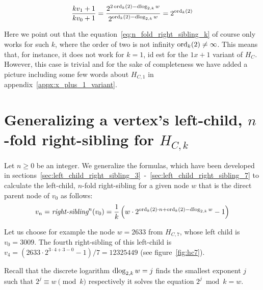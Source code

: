 \[
\frac{kv_1+1}{kv_0+1}=\frac{2^{2\operatorname{ord}_k(2)-\operatorname{dlog}_{2,k}w}}{2^{\operatorname{ord}_k(2)-\operatorname{dlog}_{2,k}w}}=2^{\operatorname{ord}_k(2)}
\]

Here we point out that the equation~\ref{eq:n_fold_right_sibling_k} of course only works for such $k$, where the order of two is not infinity $\operatorname{ord}_k(2)\ne\infty$. This means that, for instance, it does not work for $k=1$, id est for the $1x+1$ variant of $H_C$. However, this case is trivial and for the sake of completeness we have added a picture including some few words about $H_{C,1}$ in appendix~\ref{appx:x_plus_1_variant}.

\section{\texorpdfstring{Generalizing a vertex's left-child, $n$-fold right-sibling for $H_{C,k}$}{Generalizing vertex's left-child, n-fold right-sibling for HCk}}
Let $n\ge0$ be an integer. We generalize the formulas, which have been developed in sections~\ref{sec:left_child_right_sibling_3}~-~\ref{sec:left_child_right_sibling_7} to calculate the left-child, $n$-fold right-sibling for a given node $w$ that is the direct parent node of $v_0$ as follows:
\begin{equation}
\label{eq:left_child_n_fold_right_sibling_k}
v_n=\textit{right-sibling}^n(v_0)=\frac{1}{k}\left(w\cdot2^{\operatorname{ord}_k(2)\cdot n+\operatorname{ord}_k(2)-\operatorname{dlog}_{2,k}w}-1\right)
\end{equation}

Let us choose for example the node $w=2633$ from $H_{C,7}$, whose left child is $v_0=3009$. The fourth right-sibling of this left-child is $v_4=(2633\cdot2^{3\cdot4+3-0}-1)/7=12325449$ (see figure~\ref{fig:hc7}).

Recall that the discrete logarithm $\operatorname{dlog}_{2,k}w=j$ finds the smallest exponent $j$ such that $2^j\equiv w\pmod k$ respectively it solves the equation $2^j\bmod k=w$.
